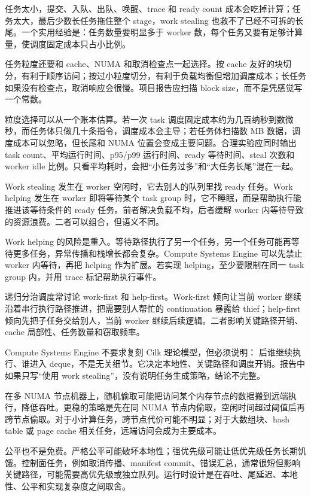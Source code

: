 任务太小，提交、入队、出队、唤醒、trace 和 ready count 成本会吃掉计算；任务太大，最后少数长任务拖住整个 stage，work stealing 也救不了已经不可拆的长尾。一个实用经验是：任务数量要明显多于 worker 数，每个任务又要有足够计算量，使调度固定成本只占小比例。

任务粒度还要和 cache、NUMA 和取消检查点一起选择。按 cache 友好的块切分，有利于顺序访问；按过小粒度切分，有利于负载均衡但增加调度成本；长任务如果没有检查点，取消响应会很慢。项目报告应扫描 block size，而不是凭感觉写一个常数。

粒度选择可以从一个账本估算。若一次 task 调度固定成本约为几百纳秒到数微秒，而任务体只做几十条指令，调度成本会主导；若任务体扫描数 MB 数据，调度成本可以忽略，但长尾和 NUMA 位置会变成主要问题。合理实验应同时输出 task count、平均运行时间、p95/p99 运行时间、ready 等待时间、steal 次数和 worker idle 比例。只看平均耗时，会把“小任务过多”和“大任务长尾”混在一起。

Work stealing 发生在 worker 空闲时，它去别人的队列里找 ready 任务。Work helping 发生在 worker 即将等待某个 task group 时，它不睡眠，而是帮助执行能推进该等待条件的 ready 任务。前者解决负载不均，后者缓解 worker 内等待导致的资源浪费。二者可以组合，但语义不同。

Work helping 的风险是重入。等待路径执行了另一个任务，另一个任务可能再等待更多任务，异常传播和栈增长都会复杂。Compute Systems Engine 可以先禁止 worker 内等待，再把 helping 作为扩展。若实现 helping，至少要限制在同一 task group 内，并用 trace 标记帮助执行事件。

递归分治调度常讨论 work-first 和 help-first。Work-first 倾向让当前 worker 继续沿着串行执行路径推进，把需要别人帮忙的 continuation 暴露给 thief；help-first 倾向先把子任务交给别人，当前 worker 继续后续逻辑。二者影响关键路径开销、cache 局部性、任务数量和窃取频率。

Compute Systems Engine 不要求复刻 Cilk 理论模型，但必须说明： 后谁继续执行、谁进入 deque，不是无关细节。它决定本地性、关键路径和调度开销。报告中如果只写“使用 work stealing”，没有说明任务生成策略，结论不完整。

在多 NUMA 节点机器上，随机偷取可能把访问某个内存节点的数据搬到远端执行，降低吞吐。更稳的策略是先在同 NUMA 节点内偷取，空闲时间超过阈值后再跨节点偷取。对于小计算任务，跨节点代价可能不明显；对于大数组块、hash table 或 page cache 相关任务，远端访问会成为主要成本。

公平也不是免费。严格公平可能破坏本地性；强优先级可能让低优先级任务长期饥饿。控制面任务，例如取消传播、manifest commit、错误汇总，通常很短但影响关键路径，可能需要高优先级或独立队列。运行时设计是在吞吐、尾延迟、本地性、公平和实现复杂度之间取舍。

